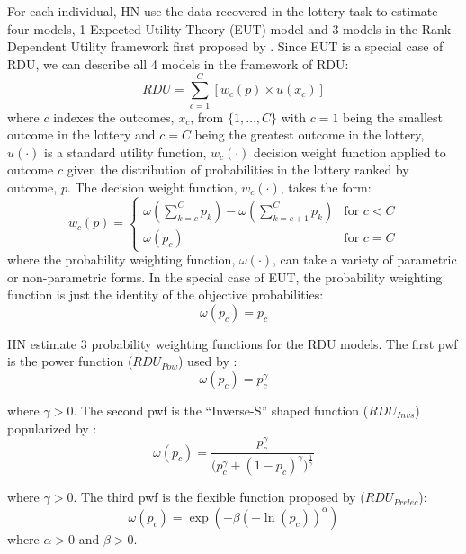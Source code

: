 \documentclass[../main.tex]{subfiles}
\begin{document}
For each individual, HN use the data recovered in the lottery task to estimate four models, 1 Expected Utility Theory (EUT) model and 3 models in the Rank Dependent Utility framework first proposed by \textcite{Quiggin1982}.
Since EUT is a special case of RDU, we can describe all 4 models in the framework of RDU:
\begin{equation}
	\label{eq4:RDU}
	RDU = \sum_{c=1}^{C} \left[ w_c(p) \times u(x_c) \right]
\end{equation}
\noindent where $c$ indexes the outcomes, $x_c$, from $\{1,\ldots,C\}$ with $c=1$ being the smallest outcome in the lottery and $c=C$ being the greatest outcome in the lottery, $u(\cdot)$ is a standard utility function, $w_c(\cdot)$ decision weight function applied to outcome $c$ given the distribution of probabilities in the lottery ranked by outcome, $p$.
The decision weight function, $w_c(\cdot)$, takes the form:
\begin{equation}
	\label{eq4:dweight}
	w_c(p) =
	\begin{cases}
		\omega\left(\displaystyle\sum_{k=c}^C p_k\right) - \omega\left(\displaystyle\sum_{k=c+1}^C p_k\right) & \text{for } c<C \\
		\omega(p_c) & \text{for } c = C
	\end{cases}
\end{equation}
\noindent where the probability weighting function, $\omega(\cdot)$, can take a variety of parametric or non-parametric forms.
In the special case of EUT, the probability weighting function is just the identity of the objective probabilities:
\begin{equation}
	\label{eq4:pw:eut}
	\omega(p_c) = p_c
\end{equation}

\noindent HN estimate 3 probability weighting functions for the RDU models.
The first pwf is the power function ($\mathit{RDU_{Pow}}$) used by \textcite{Quiggin1982}:
\begin{equation}
	\label{eq4:pw:pow}
	\omega(p_c)=p_c^\gamma
\end{equation}

\noindent where $\gamma > 0$. 
The second pwf is the \enquote{Inverse-S} shaped function ($\mathit{RDU_{Invs}}$) popularized by \textcite{Tversky1992}:
\begin{equation}
	\label{eq4:pw:inv}
	\omega(p_c) = \frac{p_c^\gamma}{\biggl(p_c^\gamma + {(1-p_c)}^\gamma\biggr)^{ \frac{1}{\gamma} } }
\end{equation}

\noindent where $\gamma > 0$. 
The third pwf is the flexible function proposed by \textcite{Prelec1998} ($\mathit{RDU_{Prelec}}$):
\begin{equation}
	\label{eq4:pw:pre}
	\omega(p_c)=\exp(-\beta(-\ln(p_c))^\alpha)
\end{equation}
\noindent where $\alpha > 0$ and $\beta > 0$.
\end{document}
